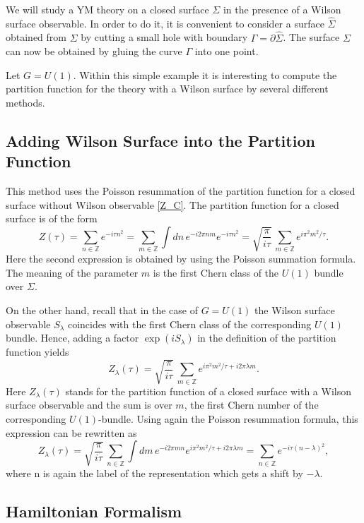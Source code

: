 \documentclass[11pt]{report}
\theoremstyle{plain}
\theoremstyle{definition}
\theoremstyle{remark}
\theoremstyle{remark}
\numberwithin{equation}{section}
\begin{document}
We will study a YM theory on a closed surface $\Sigma$ in the presence of a Wilson surface observable. In order to do it, it is
convenient to consider a surface $\widehat{\Sigma}$ obtained from $\Sigma$ by cutting a small hole with boundary
 $\Gamma = \partial \widehat{\Sigma}$. The surface $\Sigma$ can now be obtained by gluing the curve $\Gamma$ into one point.
 
Let $G=U(1)$. Within this simple example it is interesting to compute the partition function for the theory with a Wilson surface by several different methods.

\subsection{Adding Wilson Surface into the Partition Function}
This method uses the Poisson resummation of the partition function for a closed surface without Wilson observable \eqref{Z_C}. The partition function for a closed surface is of the form
%
$$
Z(\tau) =  \sum_{n \in \mathbb{Z}} e^{ -i\tau n^2} = \sum_{m \in \mathbb{Z}}  \int dn \, e^{-i2\pi nm}e^{-i\tau n^2} =
\sqrt{\frac{\pi}{i\tau}} \, \sum_{m \in \mathbb{Z}} e^{ i\pi^2m^2/\tau}.
$$
Here the second expression is obtained by using the Poisson summation formula. The meaning of the 
parameter $m$ is the first Chern class of the $U(1)$ bundle over $\Sigma$.


On the other hand, recall that in the case of $G=U(1)$ the Wilson surface observable $S_\lambda$ coincides with the first Chern class of the 
corresponding $U(1)$ bundle. Hence, adding a factor $\exp(i S_\lambda)$ in the definition of the partition function
yields
%
$$
Z_\lambda(\tau) = \sqrt{\frac{\pi}{i\tau}} \, \sum_{m \in \mathbb{Z}} e^{ i\pi^2m^2/\tau + i 2\pi \lambda m}.
$$
Here $Z_\lambda(\tau)$ stands for the partition function of a closed surface with a Wilson surface observable and the sum is over $m$, the first Chern number of the corresponding $U(1)$-bundle. Using again the Poisson resummation formula, this expression can be rewritten as
%
$$
Z_\lambda(\tau) =  \sqrt{\frac{\pi}{i\tau}} \, \sum_{n \in \mathbb{Z}} \int dm \, e^{-i2\pi mn} e^{ i\pi^2m^2/\tau + i 2\pi \lambda m} = \sum_{n \in \mathbb{Z}} e^{-i\tau (n-\lambda)^2},
$$
 where n is again the label of the representation which gets a shift by $-\lambda$.
 
 \subsection{Hamiltonian Formalism}
\end{document}
